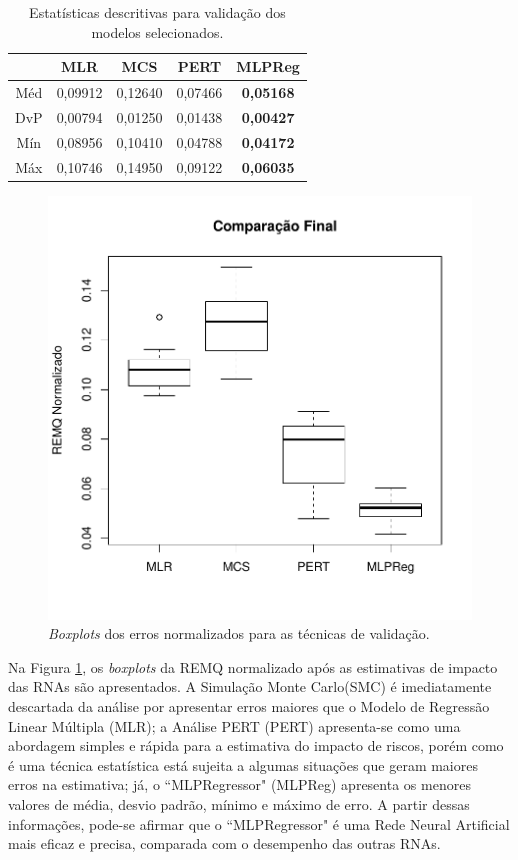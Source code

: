 \begin{table}[h]
\caption{Estatísticas descritivas para validação dos modelos selecionados.}\label{tab:validacao_descriptive} \centering
\begin{tabular}{|c|c|c|c|c|}
  \hline
   & MLR & MCS & PERT & MLPReg  \\
  \hline
  Méd & 0,09912 & 0,12640 & 0,07466 & \textbf{0,05168}   \\
  \hline
  DvP & 0,00794 & 0,01250 & 0,01438 & \textbf{0,00427}   \\
  \hline
  Mín & 0,08956 & 0,10410 & 0,04788	 & \textbf{0,04172}   \\
  \hline
  Máx & 0,10746 & 0,14950 & 0,09122 & \textbf{0,06035}   \\
  \hline
\end{tabular}
\end{table}

\begin{figure}[!h]
  \vspace{-0.2cm}
  \centering
  \includegraphics[trim = 1mm 12mm 1mm 1mm,clip,width=0.7\columnwidth]{image/validacao_ex5.pdf}
  \caption{\textit{Boxplots} dos erros normalizados para as técnicas de validação.}
  \label{fig:validacao_result}
\end{figure}

Na Figura \ref{fig:validacao_result}, os \textit{boxplots} da REMQ normalizado após as estimativas de impacto das RNAs são apresentados. A Simulação Monte Carlo(SMC) é imediatamente descartada da análise por apresentar erros maiores que o Modelo de Regressão Linear Múltipla (MLR); a Análise PERT (PERT) apresenta-se como uma abordagem simples e rápida para a estimativa do impacto de riscos, porém como é uma técnica estatística está sujeita a algumas situações que geram maiores erros na estimativa; já, o ``MLPRegressor" (MLPReg) apresenta os menores valores de média, desvio padrão, mínimo e máximo de erro. A partir dessas informações, pode-se afirmar que o ``MLPRegressor" é uma Rede Neural Artificial mais eficaz e precisa, comparada com o desempenho das outras RNAs.

